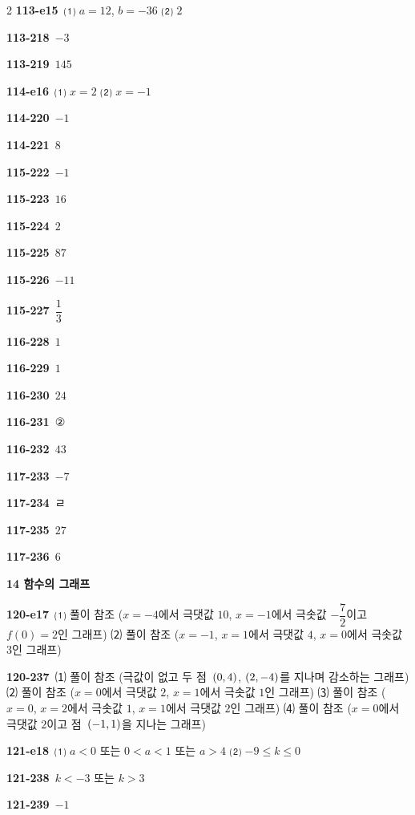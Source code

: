 \documentclass[10pt,a4paper]{article}
\begin{document}
\begin{multicols}{2}
\noindent\textbf{113-e15}\ ⑴ $a=12$, $b=-36$ ⑵ $2$\par
\noindent\textbf{113-218}\ $-3$\par
\noindent\textbf{113-219}\ $145$\par
\noindent\textbf{114-e16}\ ⑴ $x=2$ ⑵ $x=-1$\par
\noindent\textbf{114-220}\ $-1$\par
\noindent\textbf{114-221}\ $8$\par
\noindent\textbf{115-222}\ $-1$\par
\noindent\textbf{115-223}\ $16$\par
\noindent\textbf{115-224}\ $2$\par
\noindent\textbf{115-225}\ $87$\par
\noindent\textbf{115-226}\ $-11$\par
\noindent\textbf{115-227}\ $\dfrac{1}{3}$\par
\noindent\textbf{116-228}\ $1$\par
\noindent\textbf{116-229}\ $1$\par
\noindent\textbf{116-230}\ $24$\par
\noindent\textbf{116-231}\ ②\par
\noindent\textbf{116-232}\ $43$\par
\noindent\textbf{117-233}\ $-7$\par
\noindent\textbf{117-234}\ ㄹ\par
\noindent\textbf{117-235}\ $27$\par
\noindent\textbf{117-236}\ $6$\par
\noindent\textbf{14 함수의 그래프}\par\smallskip
\noindent\textbf{120-e17}\ ⑴ 풀이 참조 ($x=-4$에서 극댓값 $10$, $x=-1$에서 극솟값 $-\dfrac{7}{2}$이고 $f(0)=2$인 그래프) ⑵ 풀이 참조 ($x=-1$, $x=1$에서 극댓값 $4$, $x=0$에서 극솟값 $3$인 그래프)\par
\noindent\textbf{120-237}\ ⑴ 풀이 참조 (극값이 없고 두 점~$(0{,}\mkern3mu\mathopen{}4)$, $(2{,}\mkern3mu\mathopen{}-4)$를 지나며 감소하는 그래프) ⑵ 풀이 참조 ($x=0$에서 극댓값 $2$, $x=1$에서 극솟값 $1$인 그래프) ⑶ 풀이 참조 ($x=0$, $x=2$에서 극솟값 $1$, $x=1$에서 극댓값 $2$인 그래프) ⑷ 풀이 참조 ($x=0$에서 극댓값 $2$이고 점~$(-1{,}\mkern3mu\mathopen{}1)$을 지나는 그래프)\par
\noindent\textbf{121-e18}\ ⑴ $a<0$ 또는 $0<a<1$ 또는 $a>4$ ⑵ $-9\le k\le 0$\par
\noindent\textbf{121-238}\ $k<-3$ 또는 $k>3$\par
\noindent\textbf{121-239}\ $-1$\par

\end{multicols}
\end{document}

